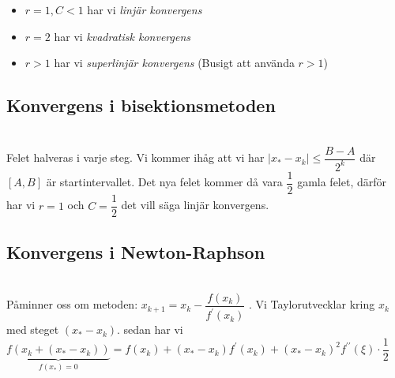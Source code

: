 \begin{itemize}
  \item $r=1, C<1$ har vi \textit{linjär konvergens}
  \item $r=2$ har vi \textit{kvadratisk konvergens}
  \item $r>1$ har vi \textit{superlinjär konvergens} (Busigt att använda $r>1$)
\end{itemize}
\par\bigskip

\subsection{Konvergens i bisektionsmetoden}\hfill\\

\noindent Felet halveras i varje steg. Vi kommer ihåg att vi har $\left|x_*-x_k\right|\leq \dfrac{B-A}{2^k}$ där $[A,B]$ är startintervallet. Det nya felet kommer då vara $\dfrac{1}{2}$ gamla felet, därför har vi $r=1$ och $C=\dfrac{1}{2}$ det vill säga linjär konvergens.
\par\bigskip

\subsection{Konvergens i Newton-Raphson}\hfill\\

\noindent Påminner oss om metoden: $x_{k+1} = x_k -\dfrac{f(x_k)}{f^{\prime}(x_k)}$ . Vi Taylorutvecklar kring $x_k$ med steget $(x_*-x_k)$. sedan har vi $\underbrace{f(x_k+(x_*-x_k))}_{\text{$f(x_*)=0$}} = f(x_k)+(x_*-x_k)f^{\prime}(x_k)+(x_*-x_k)^2f^{\prime\prime}(\xi)\cdot\dfrac{1}{2}$ 













